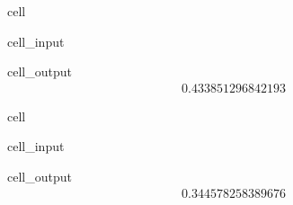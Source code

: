 \documentclass[letterpaper,10pt,english]{jupyterBook}
\begin{document}
\begin{sphinxuseclass}{cell}\begin{sphinxVerbatimInput}

\begin{sphinxuseclass}{cell_input}
\begin{sphinxVerbatim}[commandchars=\\\{\}]
\end{sphinxVerbatim}

\end{sphinxuseclass}\end{sphinxVerbatimInput}
\begin{sphinxVerbatimOutput}

\begin{sphinxuseclass}{cell_output}\begin{equation*}
\begin{split}0.433851296842193\end{split}
\end{equation*}
\end{sphinxuseclass}\end{sphinxVerbatimOutput}

\end{sphinxuseclass}
\begin{sphinxuseclass}{cell}\begin{sphinxVerbatimInput}

\begin{sphinxuseclass}{cell_input}
\begin{sphinxVerbatim}[commandchars=\\\{\}]
\end{sphinxVerbatim}

\end{sphinxuseclass}\end{sphinxVerbatimInput}
\begin{sphinxVerbatimOutput}

\begin{sphinxuseclass}{cell_output}\begin{equation*}
\begin{split}0.344578258389676\end{split}
\end{equation*}
\end{sphinxuseclass}\end{sphinxVerbatimOutput}

\end{sphinxuseclass}
\end{document}
